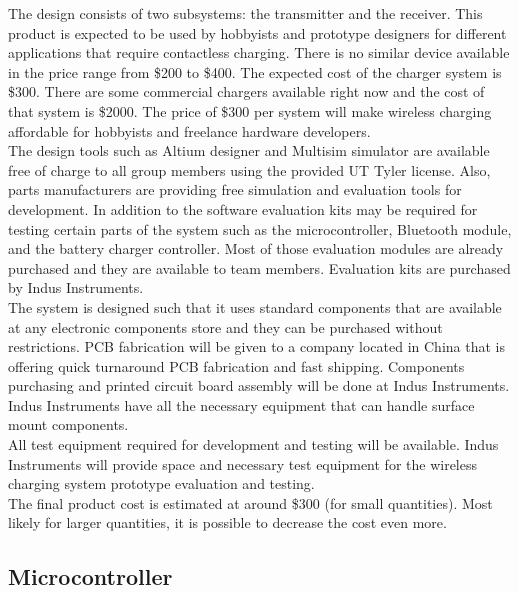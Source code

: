 \documentclass[12pt]{article}
\begin{document}
\indent \indent
The design consists of two subsystems: the transmitter and the receiver. This product is expected to be used by hobbyists and prototype designers for different applications that require contactless charging. There is no similar device available in the price range from \$200 to \$400.  The expected cost of the charger system is \$300. There are some commercial chargers available right now and the cost of that system is \$2000. The price of \$300 per system will make wireless charging affordable for hobbyists and freelance hardware developers.\\

\indent
The design tools such as Altium designer and Multisim simulator are available free of charge to all group members using the provided UT Tyler license. Also, parts manufacturers are providing free simulation and evaluation tools for development. In addition to the software evaluation kits may be required for testing certain parts of the system such as the microcontroller, Bluetooth module, and the battery charger controller. Most of those evaluation modules are already purchased and they are available to team members. Evaluation kits are purchased by Indus Instruments.\\

\indent
The system is designed such that it uses standard components that are available at any electronic components store and they can be purchased without restrictions. PCB fabrication will be given to a company located in China that is offering quick turnaround PCB fabrication and fast shipping. Components purchasing and printed circuit board assembly will be done at Indus Instruments. Indus Instruments have all the necessary equipment that can handle surface mount components.\\

\indent
All test equipment required for development and testing will be available. Indus Instruments will provide space and necessary test equipment for the wireless charging system prototype evaluation and testing.\\

\indent
The final product cost is estimated at around \$300 (for small quantities). Most likely for larger quantities, it is possible to decrease the cost even more. 

\subsection{Microcontroller}
\end{document}
